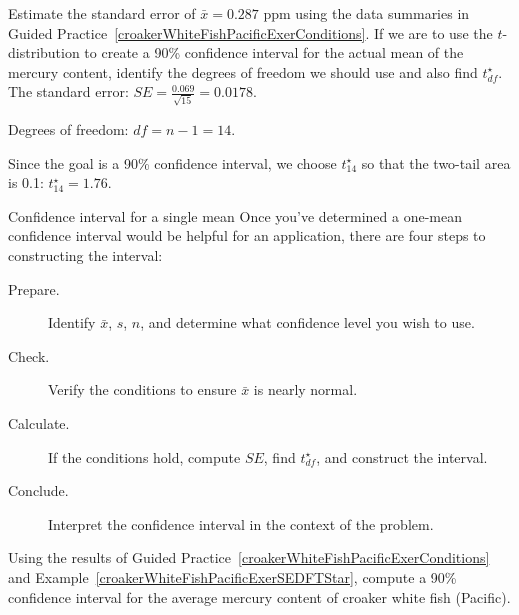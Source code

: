 \begin{examplewrap}
\begin{nexample}{Estimate the standard error of
    $\bar{x} = 0.287$ ppm using the data summaries in
    Guided Practice~\ref{croakerWhiteFishPacificExerConditions}.
    If we are to use the $t$-distribution to create a
    90\% confidence interval for the actual mean of the
    mercury content, identify the degrees of freedom we
    should use and also find $t^{\star}_{df}$.}
  \label{croakerWhiteFishPacificExerSEDFTStar}%
  The standard error: $SE = \frac{0.069}{\sqrt{15}} = 0.0178$.

  Degrees of freedom: $df = n - 1 = 14$.

  Since the goal is a 90\% confidence interval,
  we choose $t_{14}^{\star}$ so that the two-tail area
  is 0.1:
  $t^{\star}_{14} = 1.76$.
\end{nexample}
\end{examplewrap}

\begin{onebox}{Confidence interval for a single mean}
  Once you've determined a one-mean confidence interval
  would be helpful for an application,
  there are four steps to constructing the interval:
  \begin{description}
  \item[Prepare.]
      Identify $\bar{x}$, $s$, $n$, and determine what
      confidence level you wish to use.
  \item[Check.]
      Verify the conditions to ensure $\bar{x}$
      is nearly normal.
  \item[Calculate.]
      If the conditions hold, compute $SE$,
      find $t_{df}^{\star}$, and construct the interval.
  \item[Conclude.]
      Interpret the confidence interval in the context
      of the problem.
  \end{description}
\end{onebox}

\begin{exercisewrap}
\begin{nexercise}
\label{croakerWhiteFish90ci}
Using the results of Guided Practice~\ref{croakerWhiteFishPacificExerConditions} and Example~\ref{croakerWhiteFishPacificExerSEDFTStar}, compute a 90\% confidence interval for the average mercury content of croaker white fish (Pacific).\footnotemark{}
\end{nexercise}
\end{exercisewrap}

